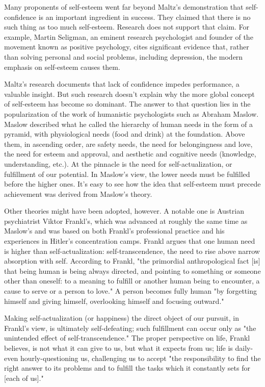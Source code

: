 \documentclass{book}
\begin{document}
Many proponents of self-esteem went far beyond Maltz’s demonstration that self-confidence is an important ingredient in success. They claimed that there is no such thing as too much self-esteem. Research does not support that claim. For example, Martin Seligman, an eminent research psychologist and founder of the movement known as positive psychology, cites significant evidence that, rather than solving personal and social problems, including depression, the modern emphasis on self-esteem causes them.

Maltz’s research documents that lack of confidence impedes performance, a valuable insight. But such research doesn’t explain why the more global concept of self-esteem has become so dominant. The answer to that question lies in the popularization of the work of humanistic psychologists such as Abraham Maslow. Maslow described what he called the hierarchy of human needs in the form of a pyramid, with physiological needs (food and drink) at the foundation. Above them, in ascending order, are safety needs, the need for belongingness and love, the need for esteem and approval, and aesthetic and cognitive needs (knowledge, understanding, etc.). At the pinnacle is the need for self-actualization, or fulfillment of our potential. In Maslow’s view, the lower needs must be fulfilled before the higher ones. It’s easy to see how the idea that self-esteem must precede achievement was derived from Maslow’s theory.

Other theories might have been adopted, however. A notable one is Austrian psychiatrist Viktor Frankl’s, which was advanced at roughly the same time as Maslow’s and was based on both Frankl’s professional practice and his experiences in Hitler’s concentration camps. Frankl argues that one human need is higher than self-actualization: self-transcendence, the need to rise above narrow absorption with self. According to Frankl, "the primordial anthropological fact [is] that being human is being always directed, and pointing to something or someone other than oneself: to a meaning to fulfill or another human being to encounter, a cause to serve or a person to love." A person becomes fully human "by forgetting himself and giving himself, overlooking himself and focusing outward."

Making self-actualization (or happiness) the direct object of our pursuit, in Frankl’s view, is ultimately self-defeating; such fulfillment can occur only as "the unintended effect of self-transcendence." The proper perspective on life, Frankl believes, is not what it can give to us, but what it expects from us; life is daily-even hourly-questioning us, challenging us to accept "the responsibility to find the right answer to its problems and to fulfill the tasks which it constantly sets for [each of us]."
\end{document}
